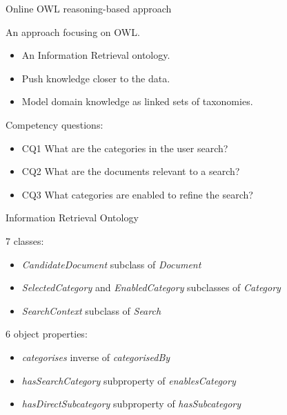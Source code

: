 \begin{frame}{Online OWL reasoning-based approach}

    An approach focusing on OWL.
    
    \begin{itemize}
        \item An Information Retrieval ontology.
        \item Push knowledge closer to the data.
        \item Model domain knowledge as linked sets of taxonomies. 
    \end{itemize}

    Competency questions:
    \begin{itemize}
        \item CQ1 What are the categories in the user search?
        \item CQ2 What are the documents relevant to a search?
        \item CQ3 What categories are enabled to refine the search?
    \end{itemize}

\end{frame}

\begin{frame}{Information Retrieval Ontology}

    7 classes:
    \begin{itemize}
        \item \emph{CandidateDocument} subclass of \emph{Document} 
        \item \emph{SelectedCategory} and \emph{EnabledCategory} subclasses of \emph{Category}
        \item \emph{SearchContext} subclass of \emph{Search}
    \end{itemize}

    6 object properties:
    \begin{itemize}
        \item \emph{categorises} inverse of \emph{categorisedBy}
        \item \emph{hasSearchCategory} subproperty of \emph{enablesCategory}
        \item \emph{hasDirectSubcategory} subproperty of \emph{hasSubcategory}
    \end{itemize}

\end{frame}


